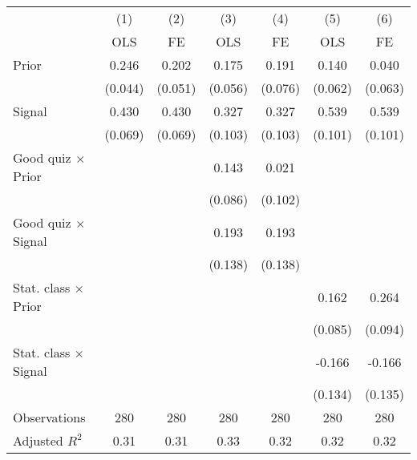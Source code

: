 \begin{tabular}{l*{6}{c}}
\hline\hline
                &\multicolumn{1}{c}{(1)}&\multicolumn{1}{c}{(2)}&\multicolumn{1}{c}{(3)}&\multicolumn{1}{c}{(4)}&\multicolumn{1}{c}{(5)}&\multicolumn{1}{c}{(6)}\\
                &\multicolumn{1}{c}{OLS}&\multicolumn{1}{c}{FE}&\multicolumn{1}{c}{OLS}&\multicolumn{1}{c}{FE}&\multicolumn{1}{c}{OLS}&\multicolumn{1}{c}{FE}\\
\hline
Prior           &    0.246&    0.202&    0.175&    0.191&    0.140&    0.040\\
                &  (0.044)&  (0.051)&  (0.056)&  (0.076)&  (0.062)&  (0.063)\\
Signal          &    0.430&    0.430&    0.327&    0.327&    0.539&    0.539\\
                &  (0.069)&  (0.069)&  (0.103)&  (0.103)&  (0.101)&  (0.101)\\
Good quiz $\times$ Prior&         &         &    0.143&    0.021&         &         \\
                &         &         &  (0.086)&  (0.102)&         &         \\
Good quiz $\times$ Signal&         &         &    0.193&    0.193&         &         \\
                &         &         &  (0.138)&  (0.138)&         &         \\
Stat. class $\times$ Prior&         &         &         &         &    0.162&    0.264\\
                &         &         &         &         &  (0.085)&  (0.094)\\
Stat. class $\times$ Signal&         &         &         &         &   -0.166&   -0.166\\
                &         &         &         &         &  (0.134)&  (0.135)\\
\hline
Observations    &      280&      280&      280&      280&      280&      280\\
Adjusted \(R^{2}\)&     0.31&     0.31&     0.33&     0.32&     0.32&     0.32\\
\hline\hline

\end{tabular}
